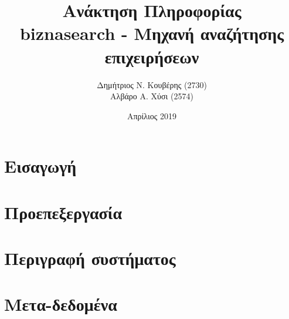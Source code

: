 \documentclass[10pt,a4paper]{article}
\title{%
  \huge \textgreek{Ανάκτηση Πληροφορίας} \\
\large biznasearch - \textgreek{Μηχανή αναζήτησης επιχειρήσεων}}
\author{
    \textgreek{Δημήτριος Ν. Κουβέρης} (2730) \\
    \textgreek{Αλβάρο Α. Χύσι} (2574)
}
\date{\textgreek{Απρίλιος} 2019}
\begin{document}

\maketitle
\newpage

\renewcommand{\contentsname}{\textgreek{Περιεχόμενα}}
\tableofcontents


\newpage
\section{\textgreek{Εισαγωγή}}



\section{\textgreek{Προεπεξεργασία}}



\section{\textgreek{Περιγραφή συστήματος}}



\section{\textgreek{Μετα-δεδομένα}}

\end{document}
